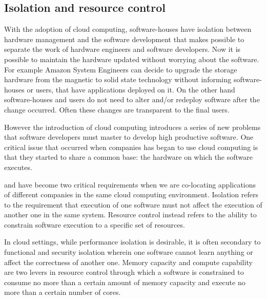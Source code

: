 \subsection*{Isolation and resource control}
\label{sec:background-cloudComputing-isolationResource}
With the adoption of cloud computing, software-houses have isolation between hardware management and the software
development that makes possible to separate the work of hardware engineers and software developers.
Now it is possible to maintain the hardware updated without worrying about the software. For example Amazon
System Engineers can decide to upgrade the storage hardware from the magnetic to solid state technology without
informing software-houses or users, that have applications deployed on it. On the other hand software-houses
and users do not need to alter and/or redeploy software after the change occurred. Often these changes are
transparent to the final users. 

However the introduction of cloud computing introduces a series of new problems that software developers must
master to develop high productive software. One critical issue that occurred when companies has began to use cloud 
computing is that they started to share a common base: the hardware on which the software executes.

 and  have become two critical requirements when we are co-locating
applications of different companies in the same cloud computing environment. Isolation refers to the requirement
that execution of one software must not affect the execution of another one in the same system. Resource control
instead refers to the ability to constrain software execution to a specific set of resources.

In cloud settings, while performance isolation is desirable, it is often secondary to functional and security
isolation wherein one software cannot learn anything or affect the correctness of another one. Memory capacity
and compute capability are two levers in resource control through which a software is constrained to consume
no more than a certain amount of memory capacity and execute no more than a certain number of cores.